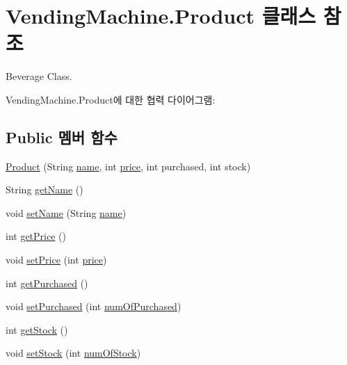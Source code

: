 \hypertarget{class_vending_machine_1_1_product}{}\section{Vending\+Machine.\+Product 클래스 참조}
\label{class_vending_machine_1_1_product}


Beverage Class.  




Vending\+Machine.\+Product에 대한 협력 다이어그램\+:
\subsection*{Public 멤버 함수}
\begin{DoxyCompactItemize}
\item 
\hyperlink{class_vending_machine_1_1_product_a1ae14f2e12352b34e6c54a50e8d14123}{Product} (String \hyperlink{class_vending_machine_1_1_product_a6d22fc106e78c69153cbf8d4ca1d53e3}{name}, int \hyperlink{class_vending_machine_1_1_product_a5f80a5a57248015f48edb6354b6d23ed}{price}, int purchased, int stock)
\item 
String \hyperlink{class_vending_machine_1_1_product_a9e33b9ce41e8a1cfcd6d394cbe82889b}{get\+Name} ()
\item 
void \hyperlink{class_vending_machine_1_1_product_aebc054f256e924dcfa3bdb92e3521a70}{set\+Name} (String \hyperlink{class_vending_machine_1_1_product_a6d22fc106e78c69153cbf8d4ca1d53e3}{name})
\item 
int \hyperlink{class_vending_machine_1_1_product_abf388db99a413403b8ebad6abe8bb593}{get\+Price} ()
\item 
void \hyperlink{class_vending_machine_1_1_product_aeeb4f3eab646fc9d1a4bb5271fd9aeb3}{set\+Price} (int \hyperlink{class_vending_machine_1_1_product_a5f80a5a57248015f48edb6354b6d23ed}{price})
\item 
int \hyperlink{class_vending_machine_1_1_product_a08ce55cace3863ca14063c74bbf9150f}{get\+Purchased} ()
\item 
void \hyperlink{class_vending_machine_1_1_product_a769cb6202859e998d7ff1d39d49abcd8}{set\+Purchased} (int \hyperlink{class_vending_machine_1_1_product_a7aed5b6b474729af5d417af9f7d8115e}{num\+Of\+Purchased})
\item 
int \hyperlink{class_vending_machine_1_1_product_a93a153b9a1134def6c22ff12b8c82f31}{get\+Stock} ()
\item 
void \hyperlink{class_vending_machine_1_1_product_a3dbc99dd95931da6005a844dd8d688d4}{set\+Stock} (int \hyperlink{class_vending_machine_1_1_product_ab5412dead0747c2da7e8e686c2e7bd15}{num\+Of\+Stock})
\end{DoxyCompactItemize}
